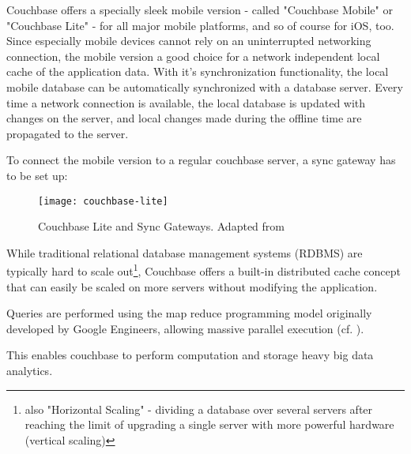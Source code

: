 Couchbase offers a specially sleek mobile version - called "Couchbase Mobile" or "Couchbase Lite" - for all major mobile platforms, and so of course for iOS, too. Since especially mobile devices cannot rely on an uninterrupted networking connection, the mobile version a good choice for a network independent local cache of the application data. With it's synchronization functionality, the local mobile database can be automatically synchronized with a database server. Every time a network connection is available, the local database is updated with changes on the server, and local changes made during the offline time are propagated to the server.

To connect the mobile version to a regular couchbase server, a sync gateway has to be set up:

\begin{figure}[H]
\centering
\texttt{[image: couchbase-lite]}
\caption{Couchbase Lite and Sync Gateways. Adapted from \cite{couchbase-lite}}
\end{figure}

While traditional relational database management systems (RDBMS) are typically hard to scale out\footnote{also "Horizontal Scaling" - dividing a database over several servers after reaching the limit of upgrading a single server with more powerful hardware (vertical scaling)}, Couchbase offers a built-in distributed cache concept that can easily be scaled on more servers without modifying the application.

Queries are performed using the map reduce programming model originally developed by Google Engineers, allowing massive parallel execution (cf. \cite{MapReduceArticle}). 

This enables couchbase to perform computation and storage heavy big data analytics. 